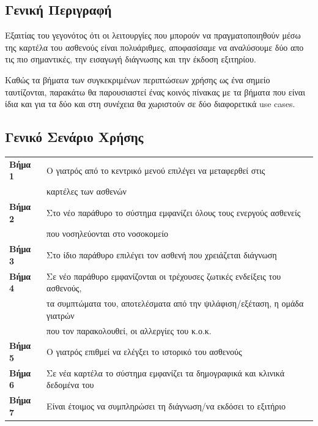 \documentclass{article}
\newcommand\T{\rule{0pt}{2.6ex}}       %
\newcommand\B{\rule[-1.2ex]{0pt}{0pt}}
\begin{document}
\subsection{Γενική Περιγραφή}

Εξαιτίας του γεγονότος ότι οι λειτουργίες που μπορούν να πραγματοποιηθούν μέσω της καρτέλα του ασθενούς είναι πολυάριθμες, αποφασίσαμε να αναλύσουμε δύο απο τις πιο σημαντικές, την εισαγωγή διάγνωσης και την έκδοση εξιτηρίου.
\par Καθώς τα βήματα των συγκεκριμένων περιπτώσεων χρήσης ως ένα σημείο ταυτίζονται, παρακάτω θα παρουσιαστεί ένας κοινός πίνακας με τα βήματα που είναι ίδια και για τα δύο και στη συνέχεια θα χωριστούν σε δύο διαφορετικά use cases. 

 \subsection{Γενικό Σενάριο Χρήσης}
 
 \begin{center}
     \begin{tabular}{|l|l|}
     \hline
      \textbf{Βήμα 1} & Ο γιατρός από το κεντρικό μενού επιλέγει να μεταφερθεί στις \T \\& καρτέλες των ασθενών \B \\
      \hline
      \textbf{Βήμα 2} &  Στο νέο παράθυρο το σύστημα εμφανίζει όλους τους ενεργούς ασθενείς \T \\& που νοσηλεύονται στο νοσοκομείο \B \\
      \hline
      \textbf{Βήμα 3} & Στο ίδιο παράθυρο επιλέγει τον ασθενή που χρειάζεται διάγνωση \T\B \\
      \hline
      \textbf{Βήμα 4} & Σε νέο παράθυρο εμφανίζονται οι τρέχουσες ζωτικές ενδείξεις του ασθενούς, \T \\& τα συμπτώματα του, αποτελέσματα από την ψιλάφιση/εξέταση, η ομάδα γιατρών \\& που τον παρακολουθεί, οι αλλεργίες του κ.ο.κ. \B \\
      \hline
      \textbf{Βήμα 5} & Ο γιατρός επιθμεί να ελέγξει το ιστορικό του ασθενούς \T\B \\
      \hline
      \textbf{Βήμα 6} & Σε νέα καρτέλα το σύστημα εμφανίζει τα δημογραφικά και κλινικά δεδομένα του \T\B \\
      \hline
      \textbf{Βήμα 7} & Είναι έτοιμος να συμπληρώσει τη διάγνωση/να εκδόσει το εξιτήριο \T\B \\
      \hline      
     
     \end{tabular}
 \end{center}
 
\end{document}
